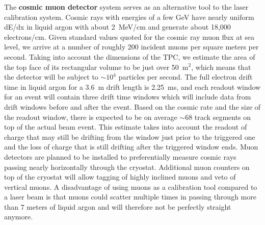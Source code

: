 The {\bf cosmic muon detector} system serves as an alternative tool to the laser calibration system. Cosmic rays with energies of a few GeV 
have nearly uniform dE/dx in liquid argon with about 2~MeV/cm and generate about 18,000 electrons/cm. %
Given standard values quoted for the cosmic ray muon flux at sea level, we arrive at a number of roughly 200 incident muons per square meters per second.  Taking into account the dimensions of the TPC, we estimate the area of the top face of its rectangular volume to be just over 50~m$^{2}$, which means that the detector will be subject to $\sim10^{4}$ particles per second.  The full electron drift time in liquid argon for a 3.6~m drift length is 2.25~ms, and each readout window for an event will contain three drift time windows which will include data from drift windows before and after the event.  Based on the cosmic rate and the size of the readout window, there is expected to be on average $\sim$68 track segments on top of the actual beam event.  This estimate takes into account the readout of charge that may still be drifting from the window just prior to the triggered one and the loss of charge that is still drifting after the triggered window ends.    Muon detectors are planned to be installed to preferentially measure cosmic rays passing nearly horizontally through the cryostat.
Additional muon counters on top of the cryostat will allow tagging of highly inclined muons and veto of vertical muons. 
  A disadvantage of using muons as a calibration tool compared to a laser beam is that muons could scatter multiple times in passing 
  through more than 7 meters of liquid argon and will therefore not be perfectly straight anymore.
  
